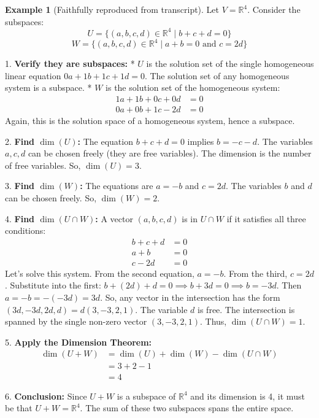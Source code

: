\documentclass[11pt]{article}
\theoremstyle{plain}
\theoremstyle{definition}
\newtheorem{example}[theorem]{Example}
\theoremstyle{remark}
\DeclareMathOperator{\dimv}{dim} %
\newcommand{\R}{\mathbb{R}}
\begin{document}
\begin{example}[Faithfully reproduced from transcript]
Let $V = \R^4$. Consider the subspaces:
\[ U = \{ (a, b, c, d) \in \R^4 \mid b + c + d = 0 \} \]
\[ W = \{ (a, b, c, d) \in \R^4 \mid a + b = 0 \text{ and } c = 2d \} \]

1.  \textbf{Verify they are subspaces:}
    *   $U$ is the solution set of the single homogeneous linear equation $0a + 1b + 1c + 1d = 0$. The solution set of any homogeneous system is a subspace.
    *   $W$ is the solution set of the homogeneous system:
        \begin{align*} 1a + 1b + 0c + 0d &= 0 \\ 0a + 0b + 1c - 2d &= 0 \end{align*}
        Again, this is the solution space of a homogeneous system, hence a subspace.

2.  \textbf{Find $\dimv(U)$:}
    The equation $b+c+d=0$ implies $b = -c-d$. The variables $a, c, d$ can be chosen freely (they are free variables). The dimension is the number of free variables.
    So, $\dimv(U) = 3$.

3.  \textbf{Find $\dimv(W)$:}
    The equations are $a = -b$ and $c = 2d$. The variables $b$ and $d$ can be chosen freely.
    So, $\dimv(W) = 2$.

4.  \textbf{Find $\dimv(U \cap W)$:}
    A vector $(a, b, c, d)$ is in $U \cap W$ if it satisfies all three conditions:
    \begin{align*} b + c + d &= 0 \\ a + b &= 0 \\ c - 2d &= 0 \end{align*}
    Let's solve this system. From the second equation, $a = -b$. From the third, $c = 2d$. Substitute into the first: $b + (2d) + d = 0 \implies b + 3d = 0 \implies b = -3d$.
    Then $a = -b = -(-3d) = 3d$.
    So, any vector in the intersection has the form $(3d, -3d, 2d, d) = d(3, -3, 2, 1)$.
    The variable $d$ is free. The intersection is spanned by the single non-zero vector $(3, -3, 2, 1)$.
    Thus, $\dimv(U \cap W) = 1$.

5.  \textbf{Apply the Dimension Theorem:}
    \begin{align*} \dimv(U+W) &= \dimv(U) + \dimv(W) - \dimv(U \cap W) \\ &= 3 + 2 - 1 \\ &= 4 \end{align*}

6.  \textbf{Conclusion:}
    Since $U+W$ is a subspace of $\R^4$ and its dimension is 4, it must be that $U+W = \R^4$. The sum of these two subspaces spans the entire space.
\end{example}
\end{document}
